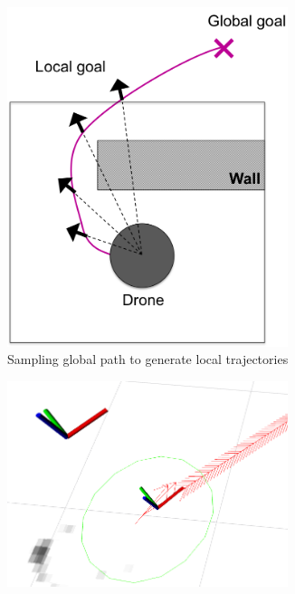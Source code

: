 \documentclass[capstone_report.tex]{subfiles}
\begin{document}
\begin{figure}[H]
    \centering
    \begin{subfigure}{0.33\textwidth}
        \centering
        \includegraphics[width=0.9\textwidth]{imgs/sample_global.png}
        \caption{Sampling global path to generate local trajectories}
    \end{subfigure}%
    \begin{subfigure}{0.33\textwidth}
        \centering
        \includegraphics[width=0.9\textwidth]{imgs/one_local_traj_large.png}

\end{subfigure}
\end{figure}
\end{document}
